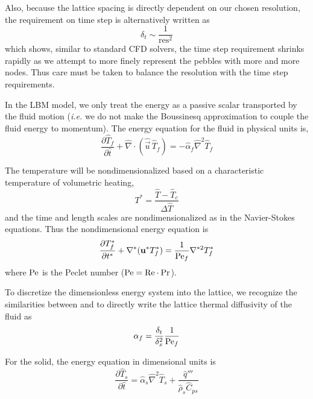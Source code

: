 Also, because the lattice spacing is directly dependent on our chosen resolution, the requirement on time step is alternatively written as
\begin{equation}
	\delta_t \sim \frac{1}{\text{res}^2}
\end{equation}
which shows, similar to standard CFD solvers, the time step requirement shrinks rapidly as we attempt to more finely represent the pebbles with more and more nodes. Thus care must be taken to balance the resolution with the time step requirements.

In the LBM model, we only treat the energy as a passive scalar transported by the fluid motion (\textit{i.e.} we do not make the Boussinesq approximation to couple the fluid energy to momentum). The energy equation for the fluid in physical units is,
\begin{equation}
	\frac{\partial \hat{T}_f}{\partial \hat{t}} + \hat{\nabla}\cdot(\hat{\vec{u}}\,\hat{T}_f) = -\hat{\alpha}_f\hat{\nabla}^2\hat{T}_f
\end{equation}

The temperature will be nondimensionalized based on a characteristic temperature of volumetric heating,
\begin{equation}
	T^* = \frac{\hat{T} - \hat{T}_c}{\Delta \hat{T}}
\end{equation}
and the time and length scales are nondimensionalized as in the Navier-Stokes equations. Thus the nondimensional energy equation is
\begin{equation}\label{eq:non-dim-energy}
	\frac{\partial T^*_f}{\partial t^*} + \nabla^*(\mathbf{u}^*T^*_f) = \frac{1}{\mathrm{Pe}_f} \nabla^{*2}T^*_f
\end{equation}
where $\mathrm{Pe}$ is the Peclet number ($\mathrm{Pe} = \mathrm{Re}\cdot \mathrm{Pr}$).

To discretize the dimensionless energy system into the lattice, we recognize the similarities between  and  to directly write the lattice thermal diffusivity of the fluid as
\begin{equation}\label{eq:fluid-alpha}
	\alpha_f = \frac{\delta_t}{\delta_x^2}\frac{1}{\mathrm{Pe}_f}
\end{equation}

For the solid, the energy equation in dimensional units is
\begin{equation}
	\frac{\partial \hat{T}_s}{\partial \hat{t}} = \hat{\alpha}_s\hat{\nabla}^2\hat{T}_s + \frac{\hat{q}'''}{\hat{\rho}_s\hat{C}_{ps}}
\end{equation}

